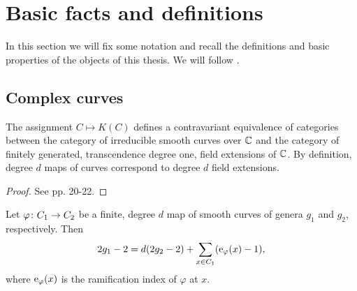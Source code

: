 \section{Basic facts and definitions}

In this section we will fix some notation and recall the definitions and basic properties of the objects of this thesis. We will follow 
\cite{Silverman2009}.

\iffalse
\subsection{Algebraic Curves}


\begin{defi}
 The \emph{$n$-dimensional affine space} is the set $\Abb^n$ of $n$-tuples with entries in $\Cbb$.
\end{defi}

\begin{defi}
 For an ideal $J\subset \Cbb[x_1,\ldots,x_n]$ we define the \emph{zero set $V(J)$ of $J$} as the set of points $p \in \Cbb$. For a subset 
$X\subset \Abb^n$ we define the \emph{ideal $I(V)$ of $X$} as usual.
\end{defi}
\fi

\subsection{Complex curves}

\begin{prop} \label{prop:curves-to-fields}
 The assignment $C\mapsto K(C)$ defines a contravariant equivalence of categories between the category of irreducible smooth curves over $\Cbb$ 
and the 
category of finitely generated, transcendence degree one, field extensions of $\Cbb$. By definition, degree $d$ maps of curves correspond 
to degree $d$ field extensions.
\end{prop}

\begin{proof}
 See \cite{Silverman2009} pp. 20-22.
\end{proof}

\begin{prop} \label{prop:hurwitz}
 Let $\varphi \colon C_1 \to C_2$ be a finite, degree $d$ map of smooth curves of genera $g_1$ and $g_2$, respectively. Then \[2g_1-2 = d(2g_2-2) + 
\sum_{x\in C_1}(\operatorname{e}_{\varphi}(x)-1),\] where $\operatorname{e}_\varphi(x)$ is the ramification index of $\varphi$ at $x$.
\end{prop}

